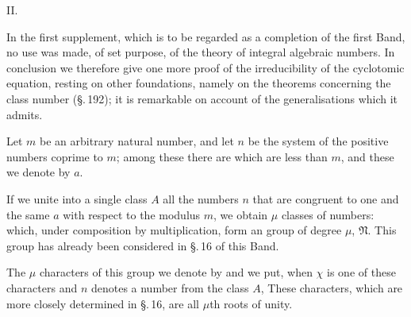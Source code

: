 
\begin{center}
II.

\end{center}

In the first supplement, which is to be regarded as a completion of the first Band,
no use was made, of set purpose, of the theory of integral algebraic numbers. In
conclusion we therefore give one more proof of the irreducibility of the cyclotomic
equation, resting on other foundations, namely on the theorems concerning the class
number (\S.\,192); it is remarkable on account of the generalisations which it admits.

Let $m$ be an arbitrary natural number, and let $n$ be the system of the positive
numbers coprime to $m$; among these there are
which are less than $m$, and these we denote by $a$.

If we unite into a single class $A$ all the numbers $n$ that are congruent to one
and the same $a$ with respect to the modulus $m$, we obtain $\mu$ classes of numbers:
which, under composition by multiplication, form an  group of
degree $\mu$, $\mathfrak{N}$. This group has already been considered in \S.\,16 of
this Band.

The $\mu$ characters of this group we denote by
and we put, when $\chi$ is one of these characters and $n$ denotes a number from
the class $A$,
These characters, which are more closely determined in \S.\,16, are all
$\mu$th roots of unity.
